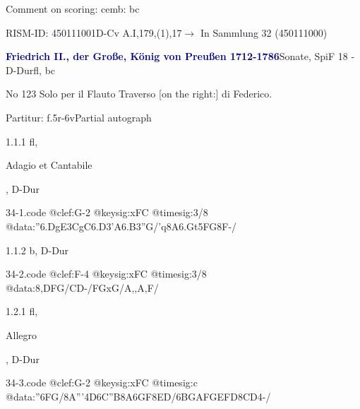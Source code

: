 \documentclass[a4paper, twocolumn, 11pt]{book}
\begin{document}
\newline %
\par Comment on scoring: cemb: bc
\par RISM-ID: 450111001\newline D-Cv  A.I,179,(1),17\newline $\rightarrow$ In Sammlung 32 (450111000)
      
\par \vspace{16pt} \textcolor{darkblue}{\textbf{Friedrich II., der Große, König von Preußen  1712-1786}}\hfillplus{[34]}\newline Sonate, SpiF 18 - D-Dur\newline fl, bc
\par \begin{itshape} No 123 Solo per il Flauto Traverso [on the right:] di Federico.\end{itshape} 
\par \textcolor{darkblue}{}  Partitur: f.5r-6v\newline Partial autograph
\par 1.1.1  fl, \begin{itshape}Adagio et Cantabile\end{itshape}, D-Dur  
\begin{filecontents*}{34-1.code}
@clef:G-2
@keysig:xFC
@timesig:3/8
@data:''{6.DgE3CgC6.D3'A}{6.B3''G}/'q8A{6.Gt5FG8F}-/
\end{filecontents*}

\newline %
\par 1.1.2  b, D-Dur  
\begin{filecontents*}{34-2.code}
@clef:F-4
@keysig:xFC
@timesig:3/8
@data:8{,DFG}/{CD}-/{FGxG}/{A,,A,F}/
\end{filecontents*}

\newline %
\par 1.2.1  fl, \begin{itshape}Allegro\end{itshape}, D-Dur  
\begin{filecontents*}{34-3.code}
@clef:G-2
@keysig:xFC
@timesig:c
@data:''{6FG}/8A'''4D6{C''B}{8A6GF}{8ED}/{6BGAF}{GEFD}{8CD}4-/
\end{filecontents*}
\end{document}
